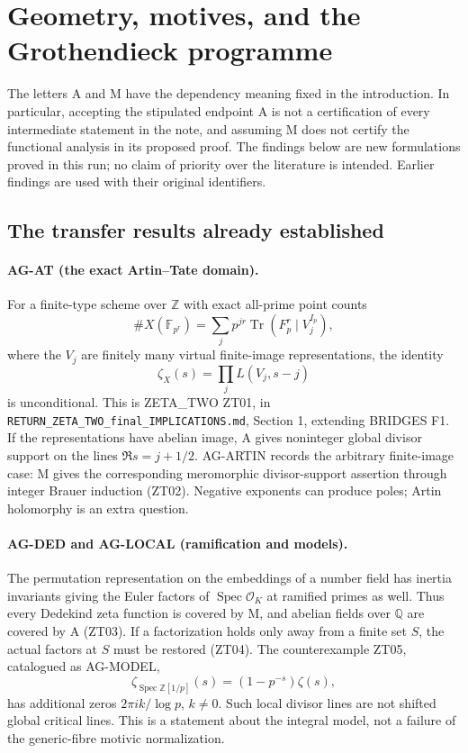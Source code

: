 \section{Geometry, motives, and the Grothendieck programme}
\label{sec:geometry}

The letters A and M have the dependency meaning fixed in the introduction.
In particular, accepting the stipulated endpoint A is not a certification of
every intermediate statement in the note, and assuming M does not certify
the functional analysis in its proposed proof. The findings below are new
formulations proved in this run; no claim of priority over the literature is
intended. Earlier findings are used with their original identifiers.

\subsection{The transfer results already established}
\label{ag:transfer}

\paragraph{AG-AT (the exact Artin--Tate domain).}
For a finite-type scheme over $\mathbb Z$ with exact all-prime point counts
\[
 \#X(\mathbb F_{p^r})=
 \sum_j p^{jr}\operatorname{Tr}(F_p^r\mid V_j^{I_p}),
\]
where the $V_j$ are finitely many virtual finite-image representations,
the identity
\[
 \zeta_X(s)=\prod_j L(V_j,s-j)
\]
is unconditional. This is ZETA\_TWO ZT01, in
\texttt{RETURN\_ZETA\_TWO\_final\_IMPLICATIONS.md}, Section 1,
extending BRIDGES F1. If the representations have abelian image, A gives
noninteger global divisor support on the lines $\Re s=j+1/2$.
AG-ARTIN records the arbitrary finite-image case: M gives the corresponding meromorphic
divisor-support assertion through integer Brauer induction (ZT02).
Negative exponents can produce poles; Artin holomorphy is an extra question.

\paragraph{AG-DED and AG-LOCAL (ramification and models).}
The permutation representation on the embeddings of a number field has
inertia invariants giving the Euler factors of $\operatorname{Spec}\mathcal
O_K$ at ramified primes as well. Thus every Dedekind zeta function is covered
by M, and abelian fields over $\mathbb Q$ are covered by A (ZT03).
If a factorization holds only away from a finite set $S$, the actual factors
at $S$ must be restored (ZT04). The counterexample ZT05, catalogued as AG-MODEL,
\[
 \zeta_{\operatorname{Spec}\mathbb Z[1/p]}(s)
       =(1-p^{-s})\zeta(s),
\]
has additional zeros $2\pi i k/\log p$, $k\ne0$. Such local divisor lines
are not shifted global critical lines. This is a statement about the
integral model, not a failure of the generic-fibre motivic normalization.

